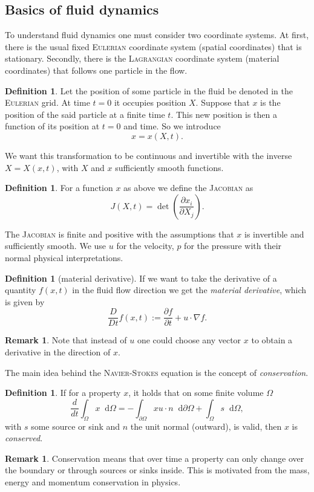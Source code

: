 \documentclass[12pt,a4paper,twoside, open=right]{scrreprt}
\theoremstyle{definition}
\newtheorem{rem}[auf]{Remark}
\newtheorem{defn}[auf]{Definition}
\theoremstyle{plain}
\newcommand{\D}{\mathop{}\!\mathrm{d}}
\begin{document}
\subsection{Basics of fluid dynamics}
To understand fluid dynamics one must consider two coordinate systems. At first, there is the usual fixed \textsc{Eulerian} coordinate system (spatial coordinates) that is stationary. Secondly, there is the \textsc{Lagrangian} coordinate system (material coordinates) that follows one particle in the flow. 
\begin{defn}
    Let the position of some particle in the fluid be denoted in the \textsc{Eulerian} grid. At time $t=0$ it occupies position $X$. Suppose that $x$ is the position of the said particle at a finite time $t$. This new position is then a function of its position at $t=0$ and time. So we introduce
    \begin{equation}
        x=x(X,t).
    \end{equation}
\end{defn}
We want this transformation to be continuous and invertible with the inverse $X=X(x,t)$, with $X$ and $x$ sufficiently smooth functions. 
\begin{defn}
    For a function $x$ as above we define the \textsc{Jacobian} as
    \begin{equation}
        J(X,t)= \det\left(\frac{\partial x_i}{\partial X_j}\right).
    \end{equation}
\end{defn}
The \textsc{Jacobian} is finite and positive with the assumptions that $x$ is invertible and sufficiently smooth. We use $u$ for the velocity, $p$ for the pressure with their normal physical interpretations.
\begin{defn}[material derivative]
    If we want to take the derivative of a quantity $f(x,t)$ in the fluid flow direction we get the \emph{material derivative}, which is given by 
    \begin{equation}
        \frac{D}{Dt}f(x,t):=\frac{\partial f}{\partial t} + u\cdot\nabla f.
    \end{equation}
\end{defn}
\begin{rem}
    Note that instead of $u$ one could choose any vector $x$ to obtain a derivative in the direction of $x$.
\end{rem}
The main idea behind the \textsc{Navier-Stokes} equation is the concept of \emph{conservation}. 
\begin{defn}
    If for a property $x$, it holds that on some finite volume $\Omega$
    \begin{equation}
        \frac{d}{dt}\int_\Omega x\D\Omega = -\int_{\partial\Omega}xu\cdot n\D\partial\Omega+\int_\Omega s\D\Omega,\label{eq:conservation}
    \end{equation}
   with $s$ some source or sink and $n$ the unit normal (outward), is valid, then $x$ is \emph{conserved}.
\end{defn}
\begin{rem}
    Conservation means that over time a property can only change over the boundary or through sources or sinks inside. This is motivated from the mass, energy and momentum conservation in physics.
\end{rem}
\end{document}
